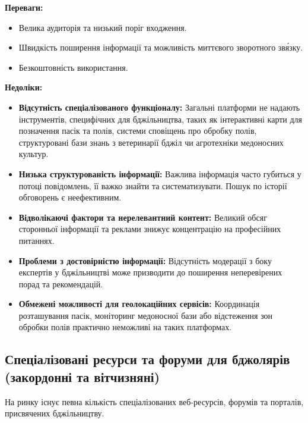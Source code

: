 \textbf{Переваги:}
\begin{itemize}
    \item Велика аудиторія та низький поріг входження.
    \item Швидкість поширення інформації та можливість миттєвого зворотного зв\'язку.
    \item Безкоштовність використання.
\end{itemize}

\textbf{Недоліки:}
\begin{itemize}
    \item \textbf{Відсутність спеціалізованого функціоналу:} Загальні платформи не надають інструментів, специфічних для бджільництва, таких як інтерактивні карти для позначення пасік та полів, системи сповіщень про обробку полів, структуровані бази знань з ветеринарії бджіл чи агротехніки медоносних культур.
    \item \textbf{Низька структурованість інформації:} Важлива інформація часто губиться у потоці повідомлень, її важко знайти та систематизувати. Пошук по історії обговорень є неефективним.
    \item \textbf{Відволікаючі фактори та нерелевантний контент:} Великий обсяг сторонньої інформації та реклами знижує концентрацію на професійних питаннях.
    \item \textbf{Проблеми з достовірністю інформації:} Відсутність модерації з боку експертів у бджільництві може призводити до поширення неперевірених порад та рекомендацій.
    \item \textbf{Обмежені можливості для геолокаційних сервісів:} Координація розташування пасік, моніторинг медоносної бази або відстеження зон обробки полів практично неможливі на таких платформах.
\end{itemize}

\subsection{Спеціалізовані ресурси та форуми для бджолярів (закордонні та вітчизняні)}
На ринку існує певна кількість спеціалізованих веб-ресурсів, форумів та порталів, присвячених бджільництву. 


